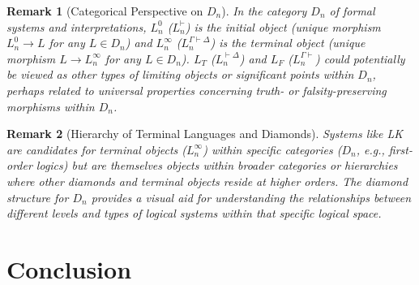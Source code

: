 \documentclass{article}
\newtheorem{remark}{Remark}[section] %
\newcommand{\LT}{L_T} %
\newcommand{\LF}{L_F} %
\begin{document}
																																																																																	\begin{remark}[Categorical Perspective on $D_n$]
																																																																																		In the category $D_n$ of formal systems and interpretations, $L^0_n$ ($L^{\vdash}_n$) is the initial object (unique morphism $L^0_n \to L$ for any $L \in D_n$) and $L^\infty_n$ ($L^{\Gamma\vdash\Delta}_n$) is the terminal object (unique morphism $L \to L^\infty_n$ for any $L \in D_n$). $\LT$ ($L^{\vdash\Delta}_n$) and $\LF$ ($L^{\Gamma\vdash}_n$) could potentially be viewed as other types of limiting objects or significant points within $D_n$, perhaps related to universal properties concerning truth- or falsity-preserving morphisms within $D_n$.
																																																																																		\end{remark}
																																																																																			
																																																																																			\begin{remark}[Hierarchy of Terminal Languages and Diamonds]
																																																																																				Systems like LK are candidates for terminal objects ($L^\infty_n$) within specific categories ($D_n$, e.g., first-order logics) but are themselves objects within broader categories or hierarchies where other diamonds and terminal objects reside at higher orders. The diamond structure for $D_n$ provides a visual aid for understanding the relationships between different levels and types of logical systems within that specific logical space.
																																																																																				\end{remark}
																																																																																					
																																																																																					\section{Conclusion}
																																																																																					
\end{document}
